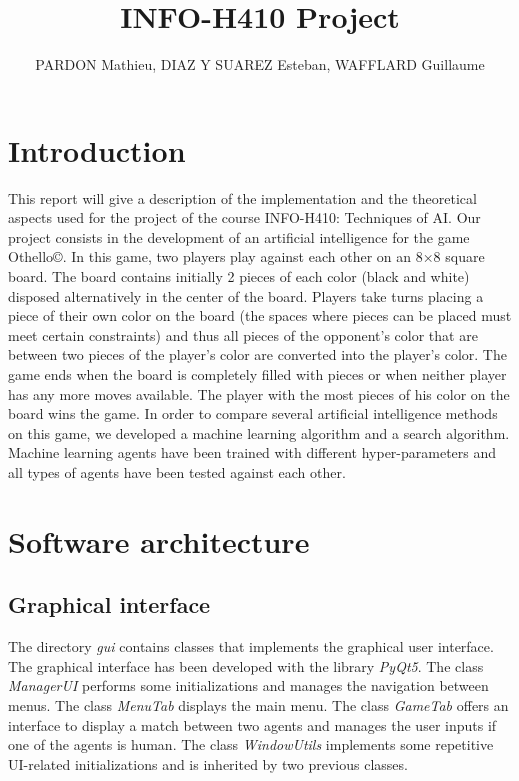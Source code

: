 \documentclass{article}
\title{INFO-H410 Project}
\author{PARDON Mathieu, DIAZ Y SUAREZ Esteban, WAFFLARD Guillaume}
\date{}
\begin{document}
\maketitle
\tableofcontents
\clearpage


\section{Introduction}

This report will give a description of the implementation and the theoretical aspects used for the project of the course INFO-H410: Techniques of AI. Our project consists in the development of an artificial intelligence for the game Othello\copyright. In this game, two players play against each other on an 8×8 square board. The board contains initially 2 pieces of each color (black and white) disposed alternatively in the center of the board. Players take turns placing a piece of their own color on the board (the spaces where pieces can be placed must meet certain constraints) and thus all pieces of the opponent's color that are between two pieces of the player's color are converted into the player's color. The game ends when the board is completely filled with pieces or when neither player has any more moves available. The player with the most pieces of his color on the board wins the game. In order to compare several artificial intelligence methods on this game, we developed a machine learning algorithm and a search algorithm. Machine learning agents have been trained with different hyper-parameters and all types of agents have been tested against each other.

\section{Software architecture}

\subsection{Graphical interface}

The directory \textit{gui} contains classes that implements the graphical user interface. The graphical interface has been developed with the library \textit{PyQt5}. The class \textit{ManagerUI} performs some initializations and manages the navigation between menus. The class \textit{MenuTab} displays the main menu. The class \textit{GameTab} offers an interface to display a match between two agents and manages the user inputs if one of the agents is human. The class \textit{WindowUtils} implements some repetitive UI-related initializations and is inherited by two previous classes.
\end{document}
